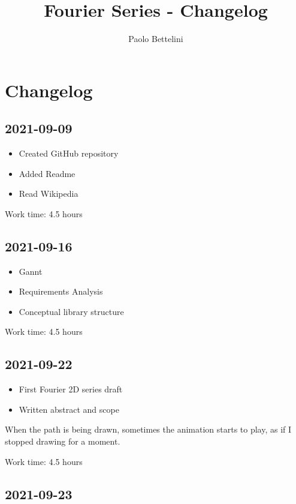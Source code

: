 \documentclass{article}
\title{Fourier Series - Changelog}
\author{Paolo Bettelini}
\date{}
\begin{document}
\maketitle
\tableofcontents
\pagebreak

\section{Changelog}

\subsection*{2021-09-09}

\begin{itemize}
    \item Created GitHub repository
    \item Added Readme
    \item Read Wikipedia
\end{itemize}

Work time: 4.5 hours

\subsection*{2021-09-16}

\begin{itemize}
    \item Gannt
    \item Requirements Analysis
    \item Conceptual library structure
\end{itemize}

Work time: 4.5 hours

\subsection*{2021-09-22}

\begin{itemize}
    \item First Fourier 2D series draft
    \item Written abstract and scope
\end{itemize}

When the path is being drawn, sometimes the animation
starts to play, as if I stopped drawing for a moment.

Work time: 4.5 hours

\subsection*{2021-09-23}
\end{document}
